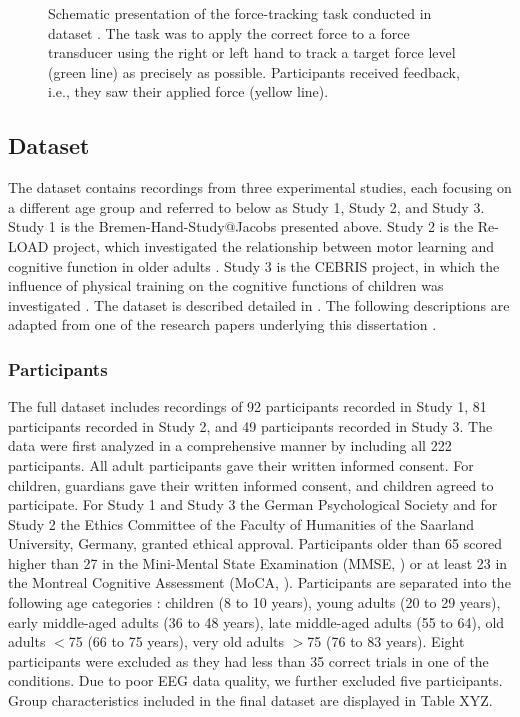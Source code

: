 \begin{figure}[h]
\begin{center}

\caption[Schematic presentation of the force-tracking task conducted in dataset .]{Schematic presentation of the force-tracking task conducted in dataset . The task was to apply the correct force to a force transducer using the right or left hand to track a target force level (green line) as precisely as possible. Participants received feedback, i.e., they saw their applied force (yellow line).}
\label{fig:DSI_exp1}
\end{center}
\end{figure}

\subsection{Dataset }
\label{methods:datasets:II}
The  dataset contains recordings from three experimental studies, each focusing on a different age group and referred to below as Study 1, Study 2, and Study 3. Study 1 is the Bremen-Hand-Study@Jacobs presented above. Study 2 is the Re-LOAD project, which investigated the relationship between motor learning and cognitive function in older adults \cite{HUBNER2018104, Hübner2018}. Study 3 is the CEBRIS project, in which the influence of physical training on the cognitive functions of children was investigated \cite{Koutsandreou2016}. The dataset is described detailed in \cite{Reuter2019}. The following descriptions are adapted from one of the research papers underlying this dissertation \cite{Goelz2023}.

\subsubsection{Participants}
\label{methods:datasets:II:participants}
The full dataset includes recordings of 92 participants recorded in Study 1, 81 participants recorded in Study 2, and 49 participants recorded in Study 3. The data were first analyzed in a comprehensive manner by \citeauthor{Reuter2019} \cite{Reuter2019} including all 222 participants. All adult participants gave their written informed consent. For children, guardians gave their written informed consent, and children agreed to participate. For Study 1 and Study 3 the German Psychological Society and for Study 2 the Ethics Committee of the Faculty of Humanities of the Saarland University, Germany, granted ethical approval. Participants older than 65 scored higher than 27 in the Mini-Mental State Examination (MMSE, \cite{Folstein1975}) or at least 23 in the Montreal Cognitive Assessment (MoCA, \cite{Julayanont2017, Nasreddine2005}). Participants are separated into the following age categories \cite{Reuter2019}: children (8 to 10 years), young adults (20 to 29 years), early middle-aged adults (36 to 48 years), late middle-aged adults (55 to 64), old adults $<$75 (66 to 75 years), very old adults $>$75 (76 to 83 years). Eight participants were excluded as they had less than 35 correct trials in one of the conditions. Due to poor EEG data quality, we further excluded five participants. Group characteristics included in the final dataset are displayed in Table XYZ.

